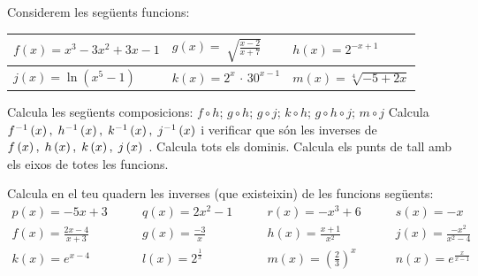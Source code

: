 \begin{mylist}
\exer Considerem les següents funcions:
 
\begin{tabular}{|p{1.64in}|p{1.65in}|p{1.65in}|} \hline 
 $f(x)=x^{3} -3x^{2} +3x-1$ & $g(x)=\sqrt[{}]{\frac{x-2}{x+7} }$ & $h(x)=2^{-x+1}$ \\ \hline
  $j(x)=\ln \left(x^{5} -1\right)$ & $k(x)=2^{x} \, \cdot \, 30^{x-1}$ & $m(x)=\sqrt[{4}]{-5+2x}$ \\
  \hline 
\end{tabular}


\begin{tasks}
\task Calcula les següents composicions:
$f\circ h$; $g\circ h$; $g\circ j$; $k\circ h$; $g\circ h \circ j$; $m\circ j$
\task Calcula $f^{-1} \left(x\right),{\rm \; }h^{-1} \left(x\right),{\rm \; }k^{-1} \left(x\right),{\rm \; }j^{-1} \left(x\right)$ i verificar que són les inverses de $f\left(x\right),{\rm \; }h\left(x\right),{\rm \; }k\left(x\right),{\rm \; }j\left(x\right){\rm \; }$.  
%
\task Calcula tots els dominis.
%
\task Calcula els punts de tall amb els eixos de totes les funcions.
\end{tasks}

\answers{[$f\circ h=2^{-3x+3}-3\,2^{-2x+2}+3\,2^{-x+1}-1$;\par $g\circ h=\sqrt{\frac{2^{-x+1}-2}{2^{-x+1}+7}}$;\par $g\circ j=\sqrt{\frac{\ln(x^5-1)-2}{\ln(x^5-1)+7}}$;\par $k\circ h=2^{2^{-x+1}}\cdot 30^{2^{-x+1}-1}$;\par   $g\circ h \circ j=\sqrt{\frac{2^{-\ln(x^5-1)+1}-2}{2^{-\ln(x^5-1)+1}+7}}$;\par $m\circ j=\sqrt[4]{-5+2\ln(x^5-1)}$,
Dom $f=\Re$; Dom $g=(-\infty,-7)\cup[2,+\infty]$; Dom $h=\Re$; Dom $j=(1,+\infty)$; Dom $k=\Re$; Dom $m=[5/2,+\infty]$]}


\exer[1] Calcula en el teu quadern les inverses (que existeixin) de les funcions següents:
\[\begin{array}{llll} 
p(x)=-5x+3\quad &\quad q(x)=2x^{2} - 1\quad & \quad r(x)=-x^{3} +6\quad & \quad s(x)=-x \\ 

f(x)=\frac{2x-4}{x+3} \quad & \quad g(x)=\frac{-3}{x} \quad & \quad h(x)=\frac{x+1}{x^{2} } \quad &\quad j(x)=\frac{-x^{2} }{x^{2} -4} \\ 

k(x)=e^{x-4} \quad &\quad l(x)=2^{\frac{1}{x} } \quad & \quad m(x)=\left(\frac{2}{3} \right)^{x} \quad & \quad n(x)=e^{\frac{x}{x-1} }  \\


\end{array}\]
\end{mylist}
